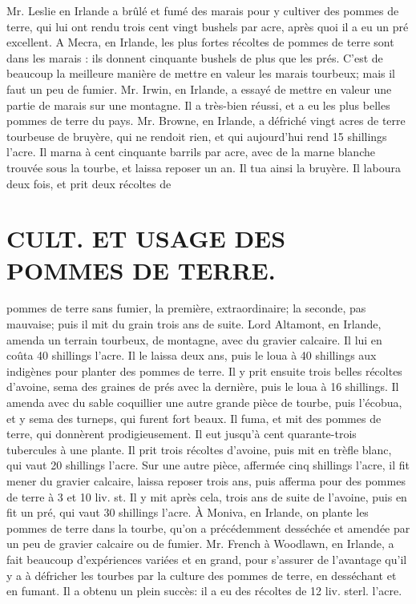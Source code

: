 Mr. Leslie en Irlande a brûlé et fumé des marais pour y cultiver des pommes de terre, qui lui ont rendu trois cent vingt bushels par acre, après quoi il a eu un pré excellent.
A Mecra, en Irlande, les plus fortes récoltes de pommes de terre sont dans les marais : ils donnent cinquante bushels de plus que les prés. C'est de beaucoup la meilleure manière de mettre en valeur les marais tourbeux; mais il faut un peu de fumier.
Mr. Irwin, en Irlande, a essayé de mettre en valeur une partie de marais sur une montagne. Il a très-bien réussi, et a eu les plus belles pommes de terre du pays.
Mr. Browne, en Irlande, a défriché vingt acres de terre tourbeuse de bruyère, qui ne rendoit rien, et qui aujourd'hui rend 15 shillings l'acre. Il marna à cent cinquante barrils par acre, avec de la marne blanche trouvée sous la tourbe, et laissa reposer un an. Il tua ainsi la bruyère. Il laboura deux fois, et prit deux récoltes de\setcounter{page}{271} \section{CULT. ET USAGE DES POMMES DE TERRE.}
pommes de terre sans fumier, la première, extraordinaire; la seconde, pas mauvaise; puis il mit du grain trois ans de suite. Lord Altamont, en Irlande, amenda un terrain tourbeux, de montagne, avec du gravier calcaire. Il lui en coûta 40 shillings l'acre. Il le laissa deux ans, puis le loua à 40 shillings aux indigènes pour planter des pommes de terre. Il y prit ensuite trois belles récoltes d'avoine, sema des graines de prés avec la dernière, puis le loua à 16 shillings. Il amenda avec du sable coquillier une autre grande pièce de tourbe, puis l'écobua, et y sema des turneps, qui furent fort beaux. Il fuma, et mit des pommes de terre, qui donnèrent prodigieusement. Il eut jusqu'à cent quarante-trois tubercules à une plante. Il prit trois récoltes d'avoine, puis mit en trèfle blanc, qui vaut 20 shillings l'acre. Sur une autre pièce, affermée cinq shillings l'acre, il fit mener du gravier calcaire, laissa reposer trois ans, puis afferma pour des pommes de terre à 3 et 10 liv. st. Il y mit après cela, trois ans de suite de l'avoine, puis en fit un pré, qui vaut 30 shillings l'acre. À Moniva, en Irlande, on plante les pommes de terre dans la tourbe, qu'on a précédemment desséchée et amendée par un peu de gravier calcaire ou de fumier.\setcounter{page}{272} Mr. French à Woodlawn, en Irlande, a fait beaucoup d'expériences variées et en grand, pour s'assurer de l'avantage qu'il y a à défricher les tourbes par la culture des pommes de terre, en desséchant et en fumant. Il a obtenu un plein succès: il a eu des récoltes de 12 liv. sterl. l'acre.
